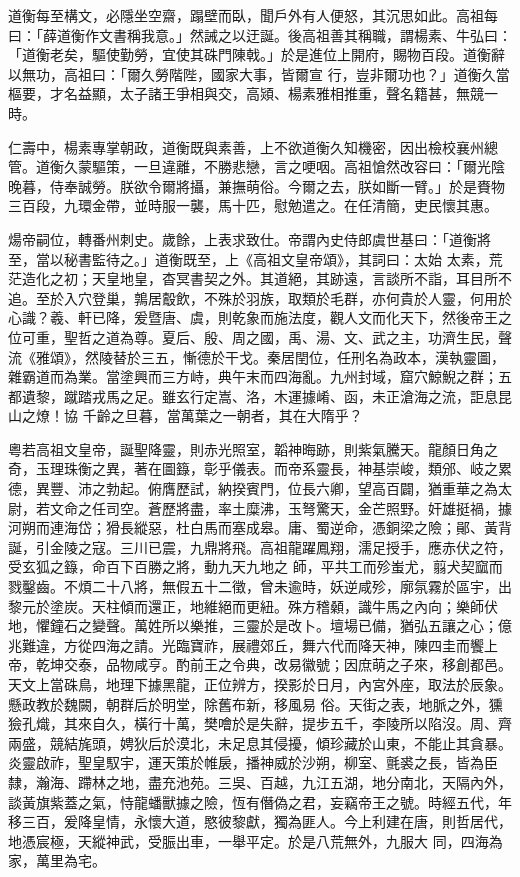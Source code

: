 \begin{pinyinscope}
 道衡每至構文，必隱坐空齋，蹋壁而臥，聞戶外有人便怒，其沉思如此。高祖每曰：「薛道衡作文書稱我意。」然誡之以迂誕。後高祖善其稱職，謂楊素、牛弘曰：「道衡老矣，驅使勤勞，宜使其硃門陳戟。」於是進位上開府，賜物百段。道衡辭以無功，高祖曰：「爾久勞階陛，國家大事，皆爾宣
 行，豈非爾功也？」道衡久當樞要，才名益顯，太子諸王爭相與交，高熲、楊素雅相推重，聲名籍甚，無競一時。



 仁壽中，楊素專掌朝政，道衡既與素善，上不欲道衡久知機密，因出檢校襄州總管。道衡久蒙驅策，一旦違離，不勝悲戀，言之哽咽。高祖愴然改容曰：「爾光陰晚暮，侍奉誠勞。朕欲令爾將攝，兼撫萌俗。今爾之去，朕如斷一臂。」於是賚物三百段，九環金帶，並時服一襲，馬十匹，慰勉遣之。在任清簡，吏民懷其惠。



 煬帝嗣位，轉番州刺史。歲餘，上表求致仕。帝謂內史侍郎虞世基曰：「道衡將至，當以秘書監待之。」道衡既至，上《高祖文皇帝頌》，其詞曰：太始
 太素，荒茫造化之初；天皇地皇，杳冥書契之外。其道絕，其跡遠，言談所不詣，耳目所不追。至於入穴登巢，鶉居鷇飲，不殊於羽族，取類於毛群，亦何貴於人靈，何用於心識？羲、軒已降，爰暨唐、虞，則乾象而施法度，觀人文而化天下，然後帝王之位可重，聖哲之道為尊。夏后、殷、周之國，禹、湯、文、武之主，功濟生民，聲流《雅頌》，然陵替於三五，慚德於干戈。秦居閏位，任刑名為政本，漢執靈圖，雜霸道而為業。當塗興而三方峙，典午末而四海亂。九州封域，窟穴鯨鯢之群；五都遺黎，蹴踏戎馬之足。雖玄行定嵩、洛，木運據崤、函，未正滄海之流，詎息昆山之燎！協
 千齡之旦暮，當萬葉之一朝者，其在大隋乎？



 粵若高祖文皇帝，誕聖降靈，則赤光照室，韜神晦跡，則紫氣騰天。龍顏日角之奇，玉理珠衡之異，著在圖籙，彰乎儀表。而帝系靈長，神基崇峻，類邠、岐之累德，異豐、沛之勃起。俯膺歷試，納揆賓門，位長六卿，望高百闢，猶重華之為太尉，若文命之任司空。蒼歷將盡，率土糜沸，玉弩驚天，金芒照野。奸雄挺禍，據河朔而連海岱；猾長縱惡，杜白馬而塞成皋。庸、蜀逆命，憑銅梁之險；鄖、黃背誕，引金陵之寇。三川已震，九鼎將飛。高祖龍躍鳳翔，濡足授手，應赤伏之符，受玄狐之籙，命百下百勝之將，動九天九地之
 師，平共工而殄蚩尤，翦犬契窳而戮鑿齒。不煩二十八將，無假五十二徵，曾未逾時，妖逆咸殄，廓氛霧於區宇，出黎元於塗炭。天柱傾而還正，地維絕而更紐。殊方稽顙，識牛馬之內向；樂師伏地，懼鐘石之變聲。萬姓所以樂推，三靈於是改卜。壇場已備，猶弘五讓之心；億兆難違，方從四海之請。光臨寶祚，展禮郊丘，舞六代而降天神，陳四圭而饗上帝，乾坤交泰，品物咸亨。酌前王之令典，改易徽號；因庶萌之子來，移創都邑。天文上當硃鳥，地理下據黑龍，正位辨方，揆影於日月，內宮外座，取法於辰象。懸政教於魏闕，朝群后於明堂，除舊布新，移風易
 俗。天街之表，地脈之外，獯獫孔熾，其來自久，橫行十萬，樊噲於是失辭，提步五千，李陵所以陷沒。周、齊兩盛，競結旄頭，娉狄后於漠北，未足息其侵擾，傾珍藏於山東，不能止其貪暴。炎靈啟祚，聖皇馭宇，運天策於帷扆，播神威於沙朔，柳室、氈裘之長，皆為臣隸，瀚海、蹛林之地，盡充池苑。三吳、百越，九江五湖，地分南北，天隔內外，談黃旗紫蓋之氣，恃龍蟠獸據之險，恆有僭偽之君，妄竊帝王之號。時經五代，年移三百，爰降皇情，永懷大道，愍彼黎獻，獨為匪人。今上利建在唐，則哲居代，地憑宸極，天縱神武，受脤出車，一舉平定。於是八荒無外，九服大
 同，四海為家，萬里為宅。




\end{pinyinscope}
